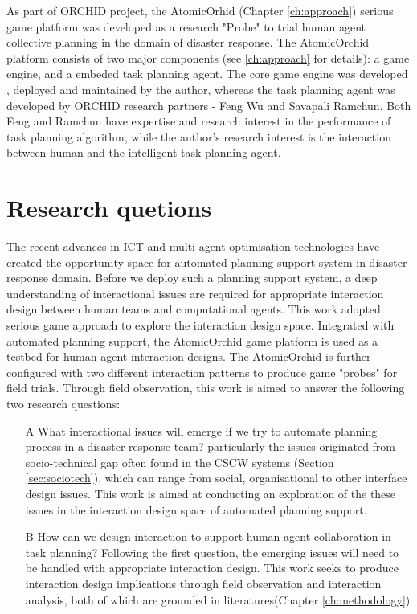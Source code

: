 As part of ORCHID project, the AtomicOrhid (Chapter \ref{ch:approach}) serious game platform was developed as a research "Probe" to trial human agent collective planning in the domain of disaster response. The AtomicOrchid platform consists of two major components (see \ref{ch:approach} for details): a game engine, and a embeded task planning agent. The core game engine was developed , deployed and maintained by the author, whereas the task planning agent was developed by ORCHID research partners - Feng Wu and Savapali Ramchun. Both Feng and Ramchun have expertise and research interest in the performance of task planning algorithm, while the author's research interest is the interaction between human and the intelligent task planning agent. \\

\section{Research quetions}
The recent advances in \ac{ICT} and multi-agent optimisation technologies have created the opportunity space for automated planning support system in disaster response domain. Before we deploy such a planning support system, a deep understanding of interactional issues are required for appropriate interaction design between human teams and computational agents. This work adopted serious game approach to explore the interaction design space. Integrated with automated planning support, the AtomicOrchid game platform is used as a testbed for human agent interaction designs.  The AtomicOrchid is further configured with two different interaction patterns to produce game "probes" for field trials. Through field observation, this work is aimed to answer the following two research questions:

\begin{enumerate}
\item[A] What interactional issues will emerge if we try to automate planning process in a disaster response team? particularly the issues originated from socio-technical gap often found in the \ac{CSCW} systems (Section \ref{sec:sociotech}), which can range from social, organisational to other interface design issues. This work is aimed at conducting an exploration of the these issues in the interaction design space of automated planning support.

\item[B] How can we design interaction to support human agent collaboration in task planning?
Following the first question, the emerging issues will need to be handled with appropriate interaction design. This work seeks to produce interaction design implications through field observation and interaction analysis, both of which are grounded in literatures(Chapter \ref{ch:methodology})
\end{enumerate}

